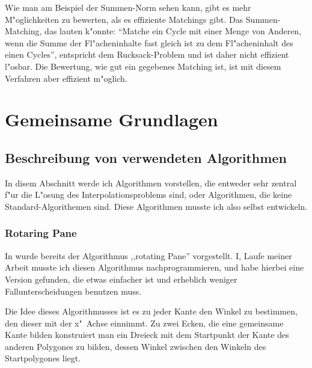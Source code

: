 Wie man am Beispiel der Summen-Norm sehen kann, gibt es mehr M"oglichkeiten zu bewerten, als es effiziente Matchings gibt. Das Summen-Matching, das lauten k"onnte: "`Matche ein Cycle mit  einer Menge von Anderen, wenn die Summe der Fl"acheninhalte fast gleich ist zu dem Fl"acheninhalt des einen Cycles"', entspricht dem Rucksack-Problem und ist daher nicht effizient l"osbar. Die Bewertung, wie gut ein gegebenes Matching ist, ist mit diesem Verfahren aber effizient m"oglich.

\section{Gemeinsame Grundlagen }

\subsection{Beschreibung von verwendeten Algorithmen}
In disem Abschnitt werde ich Algorithmen vorstellen, die entweder sehr zentral f"ur die L"osung des Interpolationsproblems sind, oder Algorithmen, die keine Standard-Algorithemen sind. Diese Algorithmen musste ich also selbst entwickeln.

\subsubsection{Rotaring Pane} \label{rotPane}
In \cite{TG} wurde bereits der Algorithmus ,,rotating Pane'' vorgestellt. I, Laufe meiner Arbeit musste ich diesen Algorithmus nachprogrammieren, und habe hierbei eine Version gefunden, die etwas einfacher ist und erheblich weniger Fallunterscheidungen benutzen muss.

Die Idee dieses Algorithmusses ist es zu jeder Kante den Winkel zu bestimmen, den dieser mit der x"~Achse einnimmt. Zu zwei Ecken, die eine gemeinsame Kante bilden konstruiert man ein Dreieck mit dem Startpunkt der Kante des anderen Polygones zu bilden, dessen Winkel zwischen den Winkeln des Startpolygones liegt.

